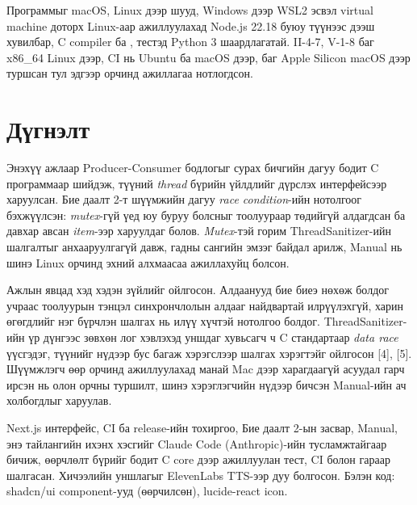 \documentclass[12pt,a4paper]{article}
\newcommand{\term}[1]{\textit{#1}} %
\begin{document}
Программыг macOS, Linux дээр шууд, Windows дээр WSL2 эсвэл virtual machine доторх Linux-аар ажиллуулахад Node.js 22.18 буюу түүнээс дээш хувилбар, C compiler ба , тестэд Python 3 шаардлагатай. II-4-7, V-1-8 баг x86\_64 Linux дээр, CI нь Ubuntu ба macOS дээр, баг Apple Silicon macOS дээр туршсан тул эдгээр орчинд ажиллагаа нотлогдсон.

\section{Дүгнэлт}

Энэхүү ажлаар Producer-Consumer бодлогыг сурах бичгийн дагуу бодит C программаар шийдэж, түүний \term{thread} бүрийн үйлдлийг дүрслэх интерфейсээр харуулсан. Бие даалт 2-т шүүмжийн дагуу \term{race condition}-ийн нотолгоог бэхжүүлсэн: \term{mutex}-гүй үед юу буруу болсныг тоолуураар төдийгүй алдагдсан ба давхар авсан \term{item}-ээр харуулдаг болов. \term{Mutex}-тэй горим ThreadSanitizer-ийн шалгалтыг анхааруулгагүй давж, гадны сангийн эмзэг байдал арилж, Manual нь шинэ Linux орчинд эхний алхмаасаа ажиллахуйц болсон.

Ажлын явцад хэд хэдэн зүйлийг ойлгосон. Алдаанууд бие биеэ нөхөж болдог учраас тоолуурын тэнцэл синхрончлолын алдааг найдвартай илрүүлэхгүй, харин өгөгдлийг нэг бүрчлэн шалгах нь илүү хүчтэй нотолгоо болдог. ThreadSanitizer-ийн үр дүнгээс зөвхөн лог хэвлэхэд уншдаг хувьсагч ч C стандартаар \term{data race} үүсгэдэг, түүнийг нүдээр бус багаж хэрэгслээр шалгах хэрэгтэйг ойлгосон [4], [5]. Шүүмжлэгч өөр орчинд ажиллуулахад манай Mac дээр харагдаагүй асуудал гарч ирсэн нь олон орчны туршилт, шинэ хэрэглэгчийн нүдээр бичсэн Manual-ийн ач холбогдлыг харуулав.

Next.js интерфейс, CI ба release-ийн тохиргоо, Бие даалт 2-ын засвар, Manual, энэ тайлангийн ихэнх хэсгийг Claude Code (Anthropic)-ийн тусламжтайгаар бичиж, өөрчлөлт бүрийг бодит C core дээр ажиллуулан тест, CI болон гараар шалгасан. Хичээлийн уншлагыг ElevenLabs TTS-ээр дуу болгосон. Бэлэн код: shadcn/ui component-ууд (өөрчилсөн), lucide-react icon.
\end{document}
